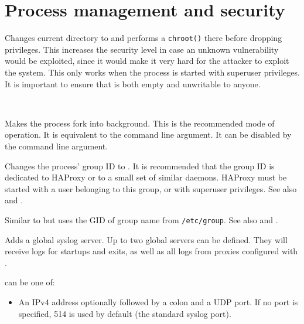 
\section{Process management and security}



\begin{keywords}

 

  Changes current directory to  and performs a \verb|chroot()|
  there before dropping privileges.
  This increases the security level in case an unknown
  vulnerability would be exploited, since it would make it very hard for the
  attacker to exploit the system. This only works when the process is started
  with superuser privileges. It is important to ensure that 
  is both empty and unwritable to anyone.

 \ 

  Makes the process fork into background. This is the recommended mode of
  operation. It is equivalent to the command line  argument.
  It can be disabled by the command line  argument.

 

  Changes the process' group ID to . It is recommended that the group
  ID is dedicated to HAProxy or to a small set of similar daemons. HAProxy must
  be started with a user belonging to this group, or with superuser privileges.
  See also  and .

 

  Similar to  but uses the GID of group name 
   from \verb|/etc/group|.
  See also  and .

   

  Adds a global syslog server. Up to two global servers can be defined. They
  will receive logs for startups and exits, as well as all logs from proxies
  configured with .

   can be one of:
	\begin{itemize}
	\item An IPv4 address optionally followed by a colon and a UDP port. If
          no port is specified, 514 is used by default (the standard syslog
          port).


\end{itemize}
\end{keywords}
